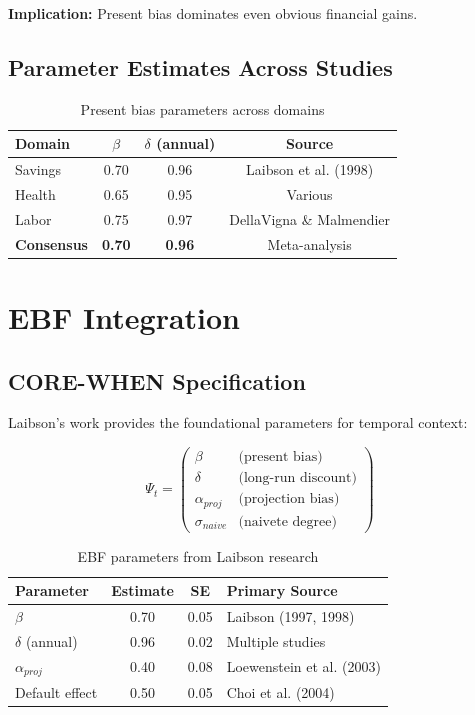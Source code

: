 \textbf{Implication:} Present bias dominates even obvious financial gains.

\subsection{Parameter Estimates Across Studies}

\begin{table}[h]
\centering
\begin{tabular}{lccc}
\hline
\textbf{Domain} & \textbf{$\beta$} & \textbf{$\delta$ (annual)} & \textbf{Source} \\
\hline
Savings & 0.70 & 0.96 & Laibson et al. (1998) \\
Health & 0.65 & 0.95 & Various \\
Labor & 0.75 & 0.97 & DellaVigna \& Malmendier \\
\textbf{Consensus} & \textbf{0.70} & \textbf{0.96} & Meta-analysis \\
\hline
\end{tabular}
\caption{Present bias parameters across domains}
\end{table}

\section{EBF Integration}

\subsection{CORE-WHEN Specification}

Laibson's work provides the foundational parameters for temporal context:

\begin{equation}
\Psi_t = \begin{pmatrix}
\beta & \text{(present bias)} \\
\delta & \text{(long-run discount)} \\
\alpha_{proj} & \text{(projection bias)} \\
\sigma_{naive} & \text{(naivete degree)}
\end{pmatrix}
\end{equation}

\begin{table}[h]
\centering
\begin{tabular}{lccl}
\hline
\textbf{Parameter} & \textbf{Estimate} & \textbf{SE} & \textbf{Primary Source} \\
\hline
$\beta$ & 0.70 & 0.05 & Laibson (1997, 1998) \\
$\delta$ (annual) & 0.96 & 0.02 & Multiple studies \\
$\alpha_{proj}$ & 0.40 & 0.08 & Loewenstein et al. (2003) \\
Default effect & 0.50 & 0.05 & Choi et al. (2004) \\
\hline
\end{tabular}
\caption{EBF parameters from Laibson research}
\end{table}

